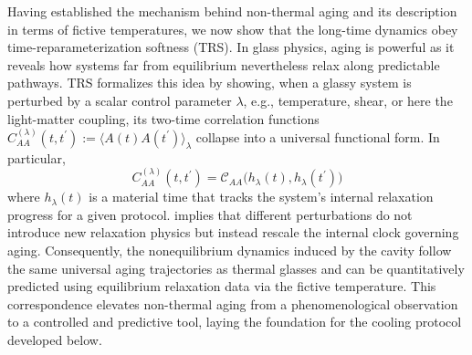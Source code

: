 \documentclass[aps, prl,
 reprint,
 superscriptaddress,
 citeautoscript,
 amsmath,amssymb,
 tightenlines
]{revtex4-2}
\begin{document}
Having established the mechanism behind non-thermal aging and its description in terms of fictive temperatures, we now show that the long-time dynamics obey time-reparameterization softness (TRS).\cite{Cugliandolo1993,Cugliandolo1997,chamon2002separation,Chamon2002,Chamon2007,Kurchan2023,ghimenti2024cleveralgorithmsglassesdo} 
In glass physics, aging is powerful as it reveals how systems far from equilibrium nevertheless relax along predictable pathways. 
TRS formalizes this idea by showing, when a glassy system is perturbed by a scalar control parameter $\lambda$, e.g., temperature, shear, or here the light-matter coupling, its two-time correlation functions $C_{AA}^{(\lambda)}(t,t^\prime):= \langle A(t) A(t^\prime) \rangle_\lambda$ collapse into a universal functional form.  In particular, 
\begin{equation}
C_{AA}^{(\lambda)}(t,t^\prime)=\mathcal{C}_{AA}\big(h_\lambda(t),h_\lambda(t^\prime)\big) \label{eq:TRS}
\end{equation}
where $h_\lambda(t)$ is a material time that tracks the system’s internal relaxation progress for a given protocol. 
 implies that different perturbations do not introduce new relaxation physics but instead rescale the internal clock governing aging. Consequently, the nonequilibrium dynamics induced by the cavity follow the same universal aging trajectories as thermal glasses and can be quantitatively predicted using equilibrium relaxation data via the fictive temperature. This correspondence elevates non-thermal aging from a phenomenological observation to a controlled and predictive tool, laying the foundation for the cooling protocol developed below.
\end{document}
